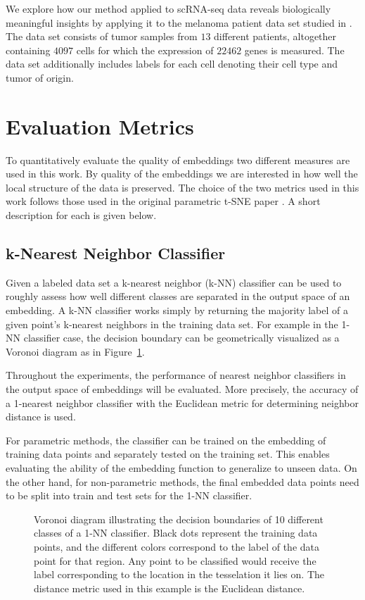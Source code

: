 We explore how our method applied to scRNA-seq data reveals biologically meaningful insights by applying it to the melanoma patient data set studied in \cite{tirosh}. The data set consists of tumor samples from $13$ different patients, altogether containing $4097$ cells for which the expression of $22462$ genes is measured. The data set additionally includes labels for each cell denoting their cell type and tumor of origin.

\section{Evaluation Metrics}

To quantitatively evaluate the quality of embeddings two different measures are used in this work. By quality of the embeddings we are interested in how well the local structure of the data is preserved. The choice of the two metrics used in this work follows those used in the original parametric t-SNE paper \cite{parametric_tsne}. A short description for each is given below.

\subsection{k-Nearest Neighbor Classifier}

Given a labeled data set a k-nearest neighbor (k-NN) classifier can be used to roughly assess how well different classes are separated in the output space of an embedding. A k-NN classifier works simply by returning the majority label of a given point's k-nearest neighbors in the training data set. For example in the 1-NN classifier case, the decision boundary can be geometrically visualized as a Voronoi diagram as in Figure~\ref{fig:voronoi}.

Throughout the experiments, the performance of nearest neighbor classifiers in the output space of embeddings will be evaluated. More precisely, the accuracy of a 1-nearest neighbor classifier with the Euclidean metric for determining neighbor distance is used.

For parametric methods, the classifier can be trained on the embedding of training data points and separately tested on the training set. This enables evaluating the ability of the embedding function to generalize to unseen data. On the other hand, for non-parametric methods, the final embedded data points need to be split into train and test sets for the 1-NN classifier.

\begin{figure}[!htb]
  \centering
  \resizebox{0.5\textwidth}{!}{\unskip}
  \caption{Voronoi diagram illustrating the decision boundaries of 10 different classes of a 1-NN classifier. Black dots represent the training data points, and the different colors correspond to the label of the data point for that region. Any point to be classified would receive the label corresponding to the location in the tesselation it lies on. The distance metric used in this example is the Euclidean distance.}
  \label{fig:voronoi}
\end{figure}

